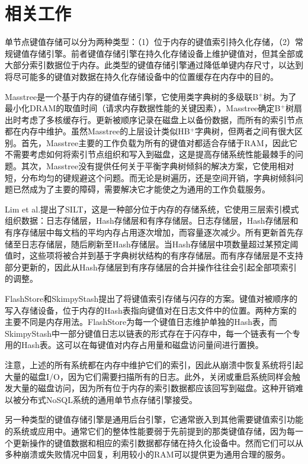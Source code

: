 \section{相关工作}

单节点键值存储可以分为两种类型：（1）位于内存的键值索引持久化存储，（2）常规键值存储引擎。前者键值存储引擎在持久化存储设备上维护键值对，但其全部或大部分索引数据位于内存。此类型的键值存储引擎通过降低单键内存尺寸，以达到将尽可能多的键值对数据在持久化存储设备中的位置缓存在内存中的目的。

Masstree是一个基于内存的键值存储引擎，它使用类字典树的多级联B$^+$树。为了最小化DRAM的取值时间（请求内存数据性能的关键因素），Masstree确定B$^+$树扇出时考虑了多核缓存行。更新被顺序记录在磁盘上以备份数据，而所有的索引节点都在内存中维护。虽然Masstree的上层设计类似HB$^+$字典树，但两者之间有很大区别。首先，Masstree主要的工作负载为所有的键值对都适合存储于RAM，因此它不需要考虑如何将索引节点组织和写入到磁盘，这是提高存储系统性能最棘手的问题。其次，Masstree没有提供任何关于平衡字典树倾斜的解决方案，它使用相对短，分布均匀的键规避这个问题。而无论是树遍历，还是空间开销，字典树倾斜问题已然成为了主要的障碍，需要解决它才能使之为通用的工作负载服务。

Lim et al.提出了SILT，这是一种部分位于内存的存储系统，它使用三层索引模式组织数据：日志存储层，Hash存储层和有序存储层。日志存储层，Hash存储层和有序存储层中每文档的平均内存占用逐次增加，而容量逐次减少。所有更新首先存储至日志存储层，随后刷新至Hash存储层。当Hash存储层中项数量超过某预定阈值时，这些项将被合并到基于字典树状结构的有序存储层。而有序存储层是不支持部分更新的，因此从Hash存储层到有序存储层的合并操作往往会引起全部项索引的调整。

FlashStore和SkimpyStash提出了将键值索引存储与闪存的方案。键值对被顺序的写入存储设备，位于内存的Hash表指向键值对在日志文件中的位置。两种方案的主要不同是内存用法。FlashStore为每一个键值日志维护单独的Hash表，而SkimpyStash中一部分键值日志以链表的形式存在于闪存中，每一个链表有一个专用的Hash表。这可以在每键值对内存占用量和磁盘访问量间进行置换。

注意，上述的所有系统都在内存中维护它们的索引，因此从崩溃中恢复系统将引起大量的磁盘I/O，因为它们需要扫描所有的日志。此外，关闭或重启系统同样会触发大量的磁盘访问，因为所有位于内存的索引数据都应该回写到磁盘。这种开销难以被分布式NoSQL系统的通用单节点存储引擎接受。

另一种类型的键值存储引擎是通用后台引擎，它通常嵌入到其他需要键值索引功能的系统或应用中。通常它们的整体性能要弱于先前提到的那类键值存储，因为每一个更新操作的键值数据和相应的索引数据都存储在持久化设备中。然而它们可以从多种崩溃或失败情况中回复，利用较小的RAM可以提供更为通用合理的服务。

